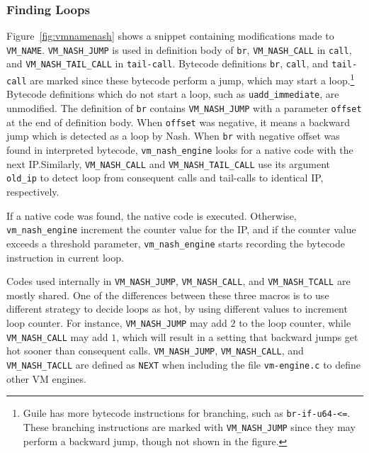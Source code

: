 \documentclass[preprint, 10pt]{sigplanconf}
\begin{document}
\subsubsection{Finding Loops}

Figure~\hyperref[fig:vmnamenash]{\ref{fig:vmnamenash}} shows a snippet
containing modifications made to \texttt{VM\_NAME}. \texttt{VM\_NASH\_JUMP} is
used in definition body of \texttt{br}, \texttt{VM\_NASH\_CALL} in
\texttt{call}, and \texttt{VM\_NASH\_TAIL\_CALL} in
\texttt{tail-call}. Bytecode definitions \texttt{br}, \texttt{call}, and
\texttt{tail-call} are marked since these bytecode perform a jump, which may
start a loop.\footnote{Guile has more bytecode instructions for branching,
  such as \texttt{br-if-u64-<=}. These branching instructions are marked with
  \texttt{VM\_NASH\_JUMP} since they may perform a backward jump, though not
  shown in the figure.}  Bytecode definitions which do not start a loop, such
as \texttt{uadd\_immediate}, are unmodified. The definition of \texttt{br}
contains \texttt{VM\_NASH\_JUMP} with a parameter \texttt{offset} at the end
of definition body. When \texttt{offset} was negative, it means a backward
jump which is detected as a loop by Nash. When \texttt{br} with negative
offset was found in interpreted bytecode, \texttt{vm\_nash\_engine} looks for
a native code with the next IP.\@ Similarly, \texttt{VM\_NASH\_CALL} and
\texttt{VM\_NASH\_TAIL\_CALL} use its argument \texttt{old\_ip} to detect loop
from consequent calls and tail-calls to identical IP, respectively.\@

If a native code was found, the native code is executed. Otherwise,
\texttt{vm\_nash\_engine} increment the counter value for the IP, and if the
counter value exceeds a threshold parameter, \texttt{vm\_nash\_engine} starts
recording the bytecode instruction in current loop.


Codes used internally in \texttt{VM\_NASH\_JUMP}, \texttt{VM\_NASH\_CALL}, and
\texttt{VM\_NASH\_TCALL} are mostly shared. One of the differences between
these three macros is to use different strategy to decide loops as hot, by
using different values to increment loop counter. For instance,
\texttt{VM\_NASH\_JUMP} may add $2$ to the loop counter, while
\texttt{VM\_NASH\_CALL} may add $1$, which will result in a setting that
backward jumps get hot sooner than consequent calls.  \texttt{VM\_NASH\_JUMP},
\texttt{VM\_NASH\_CALL}, and \texttt{VM\_NASH\_TACLL} are defined as
\texttt{NEXT} when including the file \texttt{vm-engine.c} to define other VM
engines.
\end{document}
